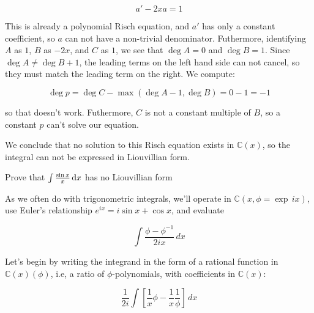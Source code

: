 $$a' - 2x a = 1$$

This is already a polynomial Risch equation, and $a'$ has only
a constant coefficient, so $a$ can not have a non-trivial denominator.
Futhermore, identifying $A$ as $1$, $B$ as $-2x$, and $C$ as $1$,
we see that $\deg A = 0$ and $\deg B = 1$.  Since $\deg A \ne \deg B + 1$,
the leading terms on the left hand side can not cancel,
so they must match the leading term on the right.
We compute:

$$\deg p = \deg C - \max(\deg A - 1, \deg B) = 0 - 1 = -1$$

so that doesn't work.  Futhermore, $C$ is not a constant
multiple of $B$, so a constant $p$ can't solve our equation.

We conclude that no solution to this Risch equation exists in ${\mathbb C}(x)$,
so the integral can not be expressed in Liouvillian form.

\endexample


\example Prove that $\int \frac{\sin x}{x} \, {\rm d}x$ has no Liouvillian form

As we often do with trigonometric integrals, we'll operate in
${\mathbb C}(x, \phi = \exp \,ix)$, use Euler's relationship
$e^{ix}=i\sin x + \cos x$, and evaluate

$$\int \frac{\phi - \phi^{-1}}{2ix} \,dx$$

Let's begin by writing the integrand in the form of a rational
function in ${\mathbb C}(x)(\phi)$, i.e, a ratio
of $\phi$-polynomials, with coefficients in ${\mathbb C}(x)$:

$$\frac{1}{2i} \int \left[ \frac{1}{x}\phi - \frac{1}{x}\frac{1}{\phi} \right]\,dx$$

\begin{comment}
We want to split the denominator into its normal and special
components, by factoring it into irreducible polynomials and
classifying each one as normal or special.  In this case, the
factoriziation is trivial, and we know from theorem \ref{basic
exponential properties} that $\phi$ is special.

Can we have any logarithms in our integral?  Let's see.
Any logarithm of a rational function can be factored and
split into separate logarithms using basic properties
of a logarithms:

$$\ln ab = \ln a + \ln b \qquad\qquad \ln\frac{a}{b} = \ln a - \ln b$$

So, we need only consider logarithms of irreducible polynomials.

Theorem \ref{basic exponential properties} also tells us that we can
have no normal polynomials in denominator of our integral,
\end{comment}


